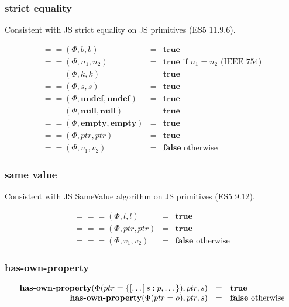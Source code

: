 \documentclass[draft, 10pt]{article}
\newcommand{\lit}[0]{l}
\newcommand{\bool}[0]{b}
\newcommand{\num}[0]{n}
\newcommand{\intg}[0]{k}
\newcommand{\str}[0]{s}
\newcommand{\undef}[0]{\textbf{undef}}
\newcommand{\nul}[0]{\textbf{null}}
\newcommand{\empt}[0]{\textbf{empty}}
\newcommand{\true}[0]{\textbf{true}}
\newcommand{\false}[0]{\textbf{false}}
\newcommand{\ophasprop}[0]{\textbf{has-own-property}}
\newcommand{\opstxeq}[0]{==}
\newcommand{\opsamevalue}[0]{===}
\newcommand{\heap}[0]{\Phi}
\newcommand{\mapadd}[3]{#1(#2 = #3)}
\newcommand{\bigval}[0]{v}
\newcommand{\oprop}[0]{p}
\newcommand{\obj}[0]{o}
\newcommand{\objlit}[2]{\{[#1]\thinspace#2\}}
\newcommand{\heapptr}{ptr}
\newcommand{\runbinop}[4]{#1(#2,#3,#4)}
\begin{document}
\subsubsection{strict equality}

Consistent with JS strict equality on JS primitives (ES5 11.9.6).

\[
\begin{array}{rcl}
\runbinop{\opstxeq}{\heap}{\bool}{\bool} &=& \true \\
\runbinop{\opstxeq}{\heap}{\num_1}{\num_2} &=& \true \textrm{ if $\num_1 = \num_2$ (IEEE 754)} \\
\runbinop{\opstxeq}{\heap}{\intg}{\intg} &=& \true \\
\runbinop{\opstxeq}{\heap}{\str}{\str} &=& \true \\
\runbinop{\opstxeq}{\heap}{\undef}{\undef} &=& \true \\
\runbinop{\opstxeq}{\heap}{\nul}{\nul} &=& \true \\
\runbinop{\opstxeq}{\heap}{\empt}{\empt} &=& \true \\
\runbinop{\opstxeq}{\heap}{\heapptr}{\heapptr} &=& \true \\
\runbinop{\opstxeq}{\heap}{\bigval_1}{\bigval_2} &=& \false \textrm{ otherwise} 
\end{array}
\]

\subsubsection{same value}

Consistent with JS SameValue algorithm on JS primitives (ES5 9.12).

\[
\begin{array}{rcl}
\runbinop{\opsamevalue}{\heap}{\lit}{\lit} &=& \true \\
\runbinop{\opsamevalue}{\heap}{\heapptr}{\heapptr} &=& \true \\
\runbinop{\opsamevalue}{\heap}{\bigval_1}{\bigval_2} &=& \false \textrm{ otherwise} 
\end{array}
\]

\subsubsection{has-own-property}

\[
\begin{array}{rcl}
\runbinop{\ophasprop}{\mapadd{\heap}{\heapptr}{\objlit{\dots}{\str : \oprop, \dots}}}{\heapptr}{\str} &=& \true \\
\runbinop{\ophasprop}{\mapadd{\heap}{\heapptr}{\obj}}{\heapptr}{\str} &=& \false \textrm{ otherwise}
\end{array}
\]
\end{document}
